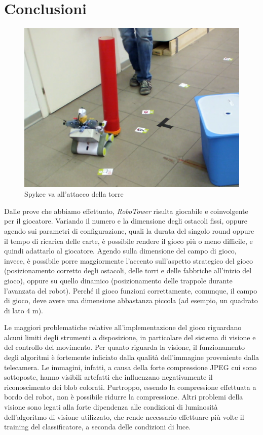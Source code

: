 \chapter{Conclusioni}
\label{cap:conclusioni}

\begin{figure}
\centering
\includegraphics[scale=0.3]{images/attaccotorre}
\caption{Spykee va all'attacco della torre}
\end{figure}

Dalle prove che abbiamo effettuato, \emph{RoboTower} risulta giocabile e coinvolgente per il giocatore. Variando il numero e la dimensione degli ostacoli fissi, oppure agendo sui parametri di configurazione, quali la durata del singolo round oppure il tempo di ricarica delle carte, è possibile rendere il gioco più o meno difficile, e quindi adattarlo al giocatore. Agendo sulla dimensione del campo di gioco, invece, è possibile porre maggiormente l'accento sull'aspetto strategico del gioco (posizionamento corretto degli ostacoli, delle torri e delle fabbriche all'inizio del gioco), oppure su quello dinamico (posizionamento delle trappole durante l'avanzata del robot). Perché il gioco funzioni correttamente, comunque, il campo di gioco, deve avere una dimensione abbastanza piccola (ad esempio, un quadrato di lato $4$ m).

Le maggiori problematiche relative all'implementazione del gioco riguardano alcuni limiti degli strumenti a disposizione, in particolare del sistema di visione e del controllo del movimento. Per quanto riguarda la visione, il funzionamento degli algoritmi è fortemente inficiato dalla qualità dell'immagine proveniente dalla telecamera. Le immagini, infatti, a causa della forte compressione JPEG cui sono sottoposte, hanno visibili artefatti che influenzano negativamente il riconoscimento dei blob colorati. Purtroppo, essendo la compressione effettuata a bordo del robot, non è possibile ridurre la compressione. Altri problemi della visione sono legati alla forte dipendenza alle condizioni di luminosità dell'algoritmo di visione utilizzato, che rende necessario effettuare più volte il training del classificatore, a seconda delle condizioni di luce.

